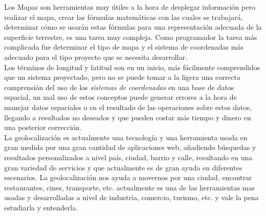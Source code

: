 
    Los Mapas son herramientas muy útiles a la hora de desplegar información pero realizar el mapa, crear las fórmulas matemáticas con las cuales se trabajará, determinar cómo se usarán estas fórmulas para una representación adecuada de la superficie terrestre, es una tarea muy compleja. Como programador la tarea más complicada fue determinar el tipo de mapa y el sistema de coordenadas más adecuado para el tipo proyecto que se necesita desarrollar.\\

    Los términos de longitud y latitud son en un inicio, más fácilmente comprendidos que un sistema proyectado, pero no se puede tomar a la ligera una correcta comprensión del uso de los \emph{sistemas de coordenadas} en una base de datos espacial, un mal uso de estos conceptos puede generar errores a la hora de manejar datos  espaciales o en el resultado de las operaciones sobre estos  datos, llegando a resultados no deseados y que pueden costar más tiempo y dinero en una posterior corrección.\\

    La geolocalización es actualmente una tecnología y una herramienta usada en gran medida por una gran cantidad de aplicaciones web, añadiendo búsquedas y resultados personalizados a nivel país, ciudad, barrio y calle, resultando en una gran variedad de servicios y que actualmente es de gran ayuda en diferentes escenarios. La geolocalización nos ayuda a movernos por una ciudad, encontrar restaurantes, cines, transporte, etc. actualmente es una de las herramientas mas usadas y desarrolladas a nivel de industria, comercio, turismo, etc. y vale la pena estudiarla y entenderla.\\












